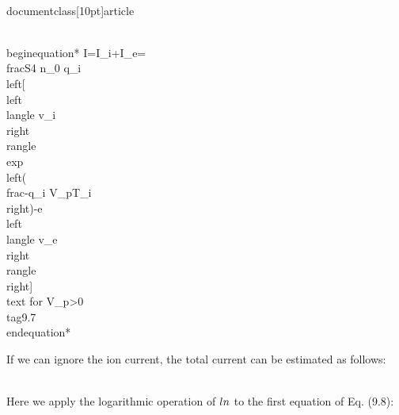 \\documentclass[10pt]{article}
\begin{document}
{{{{{\\begin{equation*}
I=I_{i}+I_{e}=\\frac{S}{4} n_{0} q_{i}\\left[\\left\\langle v_{i}\\right\\rangle \\exp \\left(\\frac{-q_{i} V_{p}}{T_{i}}\\right)-e\\left\\langle v_{e}\\right\\rangle\\right] \\text { for } V_{p}>0 \\tag{9.7}
\\end{equation*}


If we can ignore the ion current, the total current can be estimated as follows:

\\[
I= \\begin{cases}\\frac{-S}{4} n_{0} e\\left\\langle v_{e}\\right\\rangle \\exp \\left(\\frac{e V_{p}}{T_{e}}\\right) & \\left(V_{p}<0\\right)  \\tag{9.8}\\\\ \\frac{-S}{4} n_{0} e\\left\\langle v_{e}\\right\\rangle & \\left(V_{p}>0\\right)\\end{cases}
\\]

Here we apply the logarithmic operation of $\\ln$ to the first equation of Eq. (9.8):


}}}}}
\end{document}
